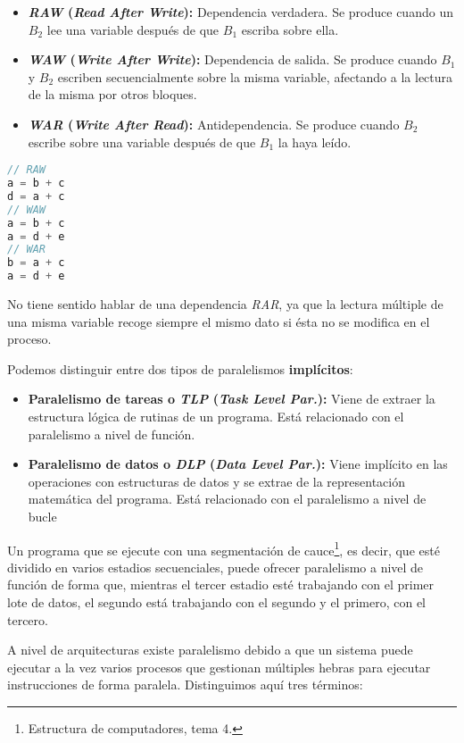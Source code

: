 \begin{itemize}
	\item\textbf{\textit{RAW} (\textit{Read After Write}):} Dependencia verdadera. Se produce cuando un $B_2$ lee una variable después de que $B_1$ escriba sobre ella.
	\item\textbf{\textit{WAW} (\textit{Write After Write}):} Dependencia de salida. Se produce cuando $B_1$ y $B_2$ escriben secuencialmente sobre la misma variable, afectando a la lectura de la misma por otros bloques.
	\item\textbf{\textit{WAR} (\textit{Write After Read}):} Antidependencia. Se produce cuando $B_2$ escribe sobre una variable después de que $B_1$ la haya leído.
\end{itemize}

\pagebreak

\begin{lstlisting}[language=C]
// RAW
a = b + c
d = a + c
// WAW
a = b + c
a = d + e
// WAR
b = a + c
a = d + e
\end{lstlisting}

No tiene sentido hablar de una dependencia \textit{RAR}, ya que la lectura múltiple de una misma variable recoge siempre el mismo dato si ésta no se modifica en el proceso.

Podemos distinguir entre dos tipos de paralelismos \textbf{implícitos}:

\begin{itemize}
	\item\textbf{Paralelismo de tareas o \textit{TLP} (\textit{Task Level Par.}):} Viene de extraer la estructura lógica de rutinas de un programa. Está relacionado con el paralelismo a nivel de función.
	\item\textbf{Paralelismo de datos o \textit{DLP} (\textit{Data Level Par.}):} Viene implícito en las operaciones con estructuras de datos y se extrae de la representación matemática del programa. Está relacionado con el paralelismo a nivel de bucle
\end{itemize}

Un programa que se ejecute con una segmentación de cauce\footnote{Estructura de computadores, tema 4.}, es decir, que esté dividido en varios estadios secuenciales, puede ofrecer paralelismo a nivel de función de forma que, mientras el tercer estadio esté trabajando con el primer lote de datos, el segundo está trabajando con el segundo y el primero, con el tercero.

A nivel de arquitecturas existe paralelismo debido a que un sistema puede ejecutar a la vez varios procesos que gestionan múltiples hebras para ejecutar instrucciones de forma paralela.
Distinguimos aquí tres términos:

